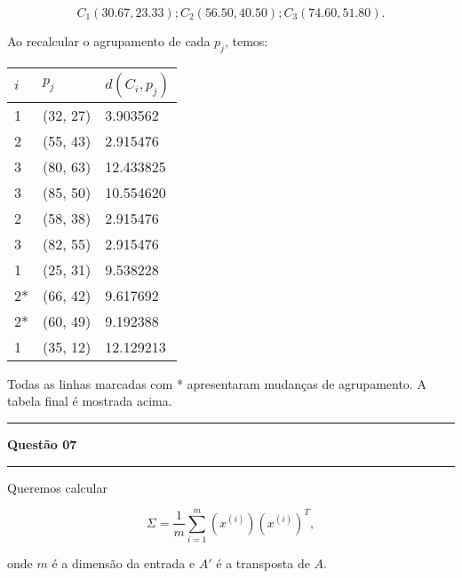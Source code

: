 \begin{equation*}
    C_1(30.67, 23.33); C_2(56.50, 40.50); C_3(74.60, 51.80).
\end{equation*}

Ao recalcular o agrupamento de cada $p_j$, temos:

\begin{center}
    \begin{tabular}{lll}
        \hline
        $i$                 & $p_j$     &   $d(C_i, p_j)$   \\     
        \hline
        1                   & (32, 27)  &   3.903562        \\
        2                   & (55, 43)  &   2.915476        \\
        3                   & (80, 63)  &   12.433825       \\
        3                   & (85, 50)  &   10.554620       \\
        2                   & (58, 38)  &   2.915476        \\
        3                   & (82, 55)  &   2.915476        \\
        1                   & (25, 31)  &   9.538228        \\
        2*                  & (66, 42)  &   9.617692        \\
        2*                  & (60, 49)  &   9.192388        \\
        1                   & (35, 12)  &   12.129213       \\
         \hline
    \end{tabular}
\end{center}

Todas as linhas marcadas com * apresentaram mudanças de agrupamento. A tabela final é mostrada acima.\\

\noindent\rule{\textwidth}{0.5mm}
\textbf{Questão 07}\\
\rule{\textwidth}{0.5mm}

Queremos calcular

\begin{equation*}
    \Sigma = \dfrac{1}{m} \sum_{i = 1}^{m} \left( x^{(i)} \right) \left({x^{(i)}} \right)^T,
\end{equation*}

\noindent
onde $m$ é a dimensão da entrada e $A'$ é a transposta de $A$.


%    
